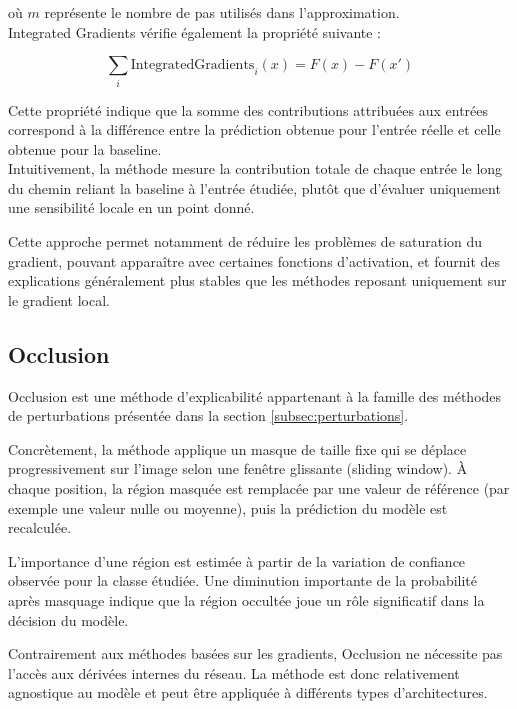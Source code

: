 \documentclass{ir}
\begin{document}
où $m$ représente le nombre de pas utilisés dans l'approximation.\\

Integrated Gradients vérifie également la propriété suivante :

\begin{equation}
\sum_i \mathrm{IntegratedGradients}_i(x) = F(x) - F(x')
\end{equation}

Cette propriété indique que la somme des contributions attribuées aux entrées correspond à la différence entre la prédiction obtenue pour l'entrée réelle et celle obtenue pour la baseline.\\

Intuitivement, la méthode mesure la contribution totale de chaque entrée le long du chemin reliant la baseline à l'entrée étudiée, plutôt que d'évaluer uniquement une sensibilité locale en un point donné.

Cette approche permet notamment de réduire les problèmes de saturation du gradient, pouvant apparaître avec certaines fonctions d'activation, et fournit des explications généralement plus stables que les méthodes reposant uniquement sur le gradient local.\\
\cite{sundararajan2017axiomatic}

\subsection{Occlusion}

Occlusion est une méthode d'explicabilité appartenant à la famille des méthodes de perturbations présentée dans la section \ref{subsec:perturbations}.

Concrètement, la méthode applique un masque de taille fixe qui se déplace progressivement sur l'image selon une fenêtre glissante (sliding window).
À chaque position, la région masquée est remplacée par une valeur de référence (par exemple une valeur nulle ou moyenne), puis la prédiction du modèle est recalculée.

L'importance d'une région est estimée à partir de la variation de confiance observée pour la classe étudiée.
Une diminution importante de la probabilité après masquage indique que la région occultée joue un rôle significatif dans la décision du modèle.

Contrairement aux méthodes basées sur les gradients, Occlusion ne nécessite pas l'accès aux dérivées internes du réseau.
La méthode est donc relativement agnostique au modèle et peut être appliquée à différents types d'architectures.
\end{document}
